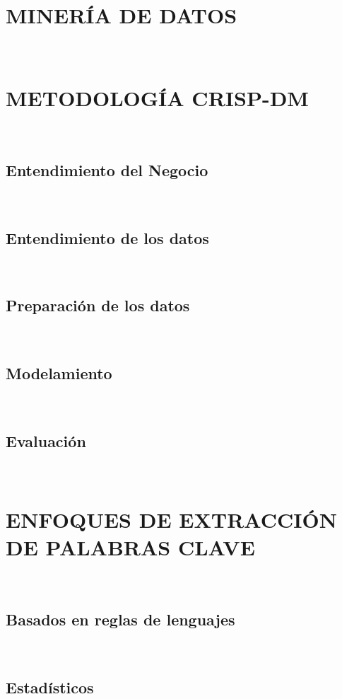 \fontsize{14}{15}\selectfont

\section{MINERÍA DE DATOS}
\blindtext\\


\section{METODOLOGÍA CRISP-DM}
\blindtext\\
\subsection{Entendimiento del Negocio}
\blindtext\\
\subsection{Entendimiento de los datos}
\blindtext\\
\subsection{Preparación de los datos}
\blindtext\\
\subsection{Modelamiento}
\blindtext\\
\subsection{Evaluación}
\blindtext\\


\section{ENFOQUES DE EXTRACCIÓN DE PALABRAS CLAVE}
\blindtext\\
\subsection{Basados en reglas de lenguajes}
\blindtext\\
\subsection{Estadísticos}
\blindtext\\
